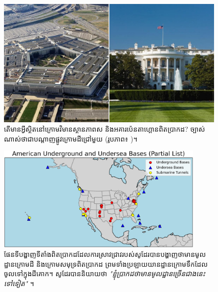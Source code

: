 \documentclass[10pt,twocolumn,letterpaper]{article}
\begin{document}
\begin{figure}[b]
\begin{center}
   \includegraphics[width=1\linewidth]{penta.jpg}
\end{center}
   \caption{តើមានអ្វីស្ថិតនៅក្រោមវិមានស្ថានភាពស និងអគារប៉េនតាហ្គោនពិតប្រាកដ? ច្បាស់ណាស់ថាជាបណ្តាញផ្លូវក្រោមដីជ្រៅមួយ (រូបភាព៖ \cite{31})។}
\label{fig:3}
\label{fig:onecol}
\end{figure}
\begin{figure}[t]
\begin{center}
\includegraphics[width=0.9\textwidth]{basescrop.png}
\end{center}
\caption{ផែនទីបង្ហាញទីតាំងពិតប្រាកដដែលការស្រាវជ្រាវរបស់សូដែរបានបង្ហាញថាមានមូលដ្ឋានក្រោមដី និងក្រោមសមុទ្រពិតប្រាកដ ព្រមទាំងប្រឡាយយានដ្ឋានក្រោមទឹកដែលចូលទៅក្នុងដីគោក។ សូដែរបាននិយាយថា \textit{"ខ្ញុំប្រាកដថាមានមូលដ្ឋានច្រើនជាងនេះទៅទៀត"} \cite{22}។}
\label{fig:4}
\end{figure}
\end{document}
